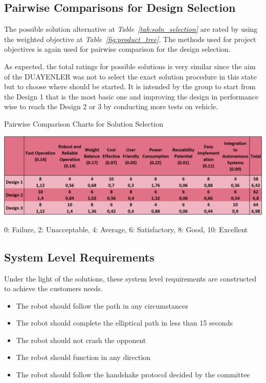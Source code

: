 \documentclass[a4paper,12pt]{article}
\begin{document}
\subsection{Pairwise Comparisons for Design Selection}		
	
	The possible solution alternative at \textit{Table~\ref{tab:soln_selection}} are rated by using the weighted objective at \textit{Table~\ref{fig:product_tree}}. The methods used for project objectives is again used for pairwise comparison for the design selection.
	
	As expected, the total ratings for possible solutions is very similar since the aim of the DUAYENLER was not to select the exact solution procedure in this state but to choose where should be started. It is intended by the group to start from the Design 1 that is the most basic one and improving the design in performance wise to reach the Design 2 or 3 by conducting more tests on vehicle.	
		
	\begin{table}[H]
		\centering
		\caption{\label{tab:soln_selection}Pairwise Comparison Charts for Solution Selection}\vspace{-.2cm}
		\includegraphics[width=\textwidth,center]{images/soln_selection3} 
	\vspace*{-.9cm}	\begin{center}
		{\small 0: Failure, 2: Unacceptable, 4: Average, 6: Satisfactory, 8: Good, 10: Excellent }	
		\end{center}
	\end{table}	\vspace*{-.5cm}	
	
	
\subsection{System Level Requirements}
	Under the light of the solutions, these system level requirements are constructed to achieve the customers needs.  
	\begin{itemize}
		\item The robot should follow the path in any circumstances
		\item The robot should complete the elliptical path in less than 15 seconds
		\item The robot should not crash the opponent
		\item The robot should function in any direction
		\item The robot should follow the handshake protocol decided by the committee
	\end{itemize}
	
\end{document}
